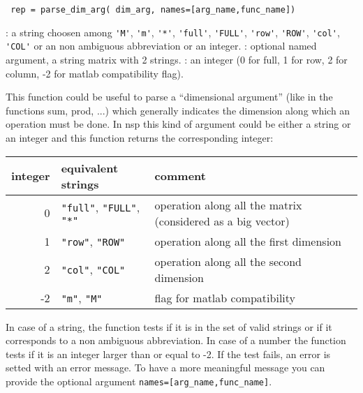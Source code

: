 
\begin{mandesc}
\end{mandesc}
\begin{calling_sequence}
\begin{verbatim}
 rep = parse_dim_arg( dim_arg, names=[arg_name,func_name])  
\end{verbatim}
\end{calling_sequence}
\begin{parameters}
  \begin{varlist}
    : a string choosen among  \verb+'M'+, \verb+'m'+, \verb+'*'+, \verb+'full'+, \verb+'FULL'+, \verb+'row'+,
    \verb+'ROW'+, \verb+'col'+, \verb+'COL'+ or an non ambiguous abbreviation or an integer.
    : optional named argument, a string matrix with 2 strings.
    : an integer (0 for full, 1 for row, 2 for column, -2 for matlab compatibility flag).
  \end{varlist}
\end{parameters}
\begin{mandescription}
  This function could be useful to parse a ``dimensional argument'' (like in 
the functions sum, prod, ...) which generally indicates the dimension along which 
an operation must be done. In nsp this kind of argument could be either a string
or an integer and this function returns the corresponding integer:  

\begin{tabular}{|r|l|l|}
\hline
integer & equivalent strings & comment \\
\hline
0       & \verb+"full"+, \verb+"FULL"+, \verb+"*"+  &  operation along all the matrix (considered as a big vector) \\
1       & \verb+"row"+, \verb+"ROW"+                &  operation along all the first dimension \\
2       & \verb+"col"+, \verb+"COL"+                &  operation along all the second dimension \\
-2      & \verb+"m"+, \verb+"M"+                    &  flag for matlab compatibility \\
\hline
\end{tabular}
 
In case of a string, the function tests if it is in the set of
valid strings or if it corresponds to a non ambiguous abbreviation. In case of a number
the function tests if it is an integer larger than or equal to -2. If the test
fails, an error is setted with an error message. To have a more
meaningful message you can provide the optional argument 
\verb+names=[arg_name,func_name]+.
\end{mandescription}

